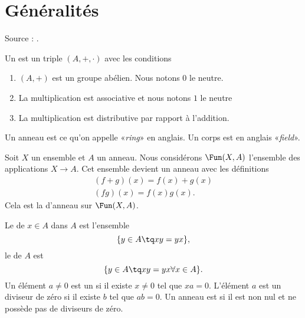 
\section{Généralités}

Source : \cite{Tauvel}.

\begin{definition}
    Un  est un triple \( (A,+,\cdot)\) avec les conditions
    \begin{enumerate}
        \item
            \( (A,+)\) est un groupe abélien. Nous notons \( 0\) le neutre.
        \item
            La multiplication est associative et nous notons \( 1\) le neutre
        \item
            La multiplication est distributive par rapport à l'addition.
    \end{enumerate}
\end{definition}

\begin{remark}
    Un anneau est ce qu'on appelle «\emph{ring}» en anglais. Un corps est en anglais «\emph{field}».
\end{remark}

Soit \( X\) un ensemble et $A$ un anneau. Nous considérons \( \Fun(X,A)\) l'ensemble des applications \( X\to A\). Cet ensemble devient un anneau avec les définitions
\begin{subequations}
    \begin{align}
        (f+g)(x)=f(x)+g(x)\\
        (fg)(x)=f(x)g(x).
    \end{align}
\end{subequations}
Cela est la  d'anneau sur \( \Fun(X,A)\).

Le  de \( x\in A\) dans \( A\) est l'ensemble
\begin{equation}
    \{ y\in A\tq xy=yx \},
\end{equation}
le  de \( A\) est
\begin{equation}
    \{ y\in A\tq xy=yx\forall x\in A \}.
\end{equation}
Un élément \( a\neq 0\) est un  si il existe \( x\neq 0\) tel que $xa=0$. L'élément \( a\) est un diviseur de zéro  si il existe \( b\) tel que \( ab=0\). Un anneau est  si il est non nul et ne possède pas de diviseurs de zéro.

